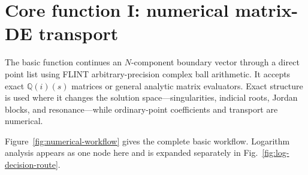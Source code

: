 \documentclass[11pt]{article}
\begin{document}
\section{Core function I: numerical matrix-DE transport}
\label{sec:numerical-core}

The basic function continues an $N$-component boundary vector through a direct point list
using FLINT arbitrary-precision complex ball arithmetic.  It accepts exact
$\mathbb Q(i)(s)$ matrices or general analytic matrix evaluators.  Exact structure is used
where it changes the solution space---singularities, indicial roots, Jordan blocks, and
resonance---while ordinary-point coefficients and transport are numerical.

Figure~\ref{fig:numerical-workflow} gives the complete basic workflow.  Logarithm analysis
appears as one node here and is expanded separately in Fig.~\ref{fig:log-decision-route}.
\end{document}
